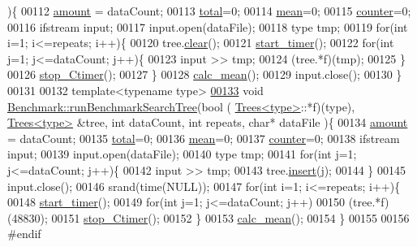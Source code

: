 \begin{DoxyCode}
      )\{
00112   \hyperlink{class_benchmark_a1d0eaa6febe9b7a7f5f5147e83f60910}{amount} = dataCount;
00113   \hyperlink{class_benchmark_a7130c0718e3a3ab2fea70285dab122a2}{total}=0; 
00114   \hyperlink{class_benchmark_aa88092b6164ad7d1243162d3012f729a}{mean}=0;
00115   \hyperlink{class_benchmark_a3a56c7dad0b21e490f3024d5d0027f31}{counter}=0;
00116   ifstream input;
00117   input.open(dataFile);
00118   type tmp;
00119   \textcolor{keywordflow}{for}(\textcolor{keywordtype}{int} i=1; i<=repeats; i++)\{
00120     tree.\hyperlink{class_trees_ac9020e649202c980ecb9917e13524471}{clear}();
00121     \hyperlink{class_timer_a83d4b873e3275a61004b5679672045c0}{start\_timer}();
00122     \textcolor{keywordflow}{for}(\textcolor{keywordtype}{int} j=1; j<=dataCount; j++)\{
00123       input >> tmp;
00124       (tree.*f)(tmp);
00125     \}
00126     \hyperlink{class_benchmark_ab65889d4c2df3eb503048ab1cc6e7413}{stop\_Ctimer}();
00127   \}
00128   \hyperlink{class_benchmark_ac4d5360d2850510913efe07cf957f4c1}{calc\_mean}();
00129   input.close();
00130 \}
00131 
00132 \textcolor{keyword}{template}<\textcolor{keyword}{typename} type>
\hypertarget{benchmark_8hh_source_l00133}{}\hyperlink{class_benchmark_a9e6b5ef8df351452be5fa0c8d127367a}{00133} \textcolor{keywordtype}{void} \hyperlink{class_benchmark_a9e6b5ef8df351452be5fa0c8d127367a}{Benchmark::runBenchmarkSearchTree}(\textcolor{keywordtype}{bool} (
      \hyperlink{class_trees}{Trees<type>}::*f)(type), \hyperlink{class_trees}{Trees<type>} &tree, \textcolor{keywordtype}{int} dataCount, \textcolor{keywordtype}{int} repeats, \textcolor{keywordtype}{char}* dataFile
      )\{
00134   \hyperlink{class_benchmark_a1d0eaa6febe9b7a7f5f5147e83f60910}{amount} = dataCount;
00135   \hyperlink{class_benchmark_a7130c0718e3a3ab2fea70285dab122a2}{total}=0; 
00136   \hyperlink{class_benchmark_aa88092b6164ad7d1243162d3012f729a}{mean}=0;
00137   \hyperlink{class_benchmark_a3a56c7dad0b21e490f3024d5d0027f31}{counter}=0;
00138   ifstream input;
00139   input.open(dataFile);
00140   type tmp;
00141   \textcolor{keywordflow}{for}(\textcolor{keywordtype}{int} j=1; j<=dataCount; j++)\{
00142     input >> tmp;
00143     tree.\hyperlink{class_trees_a00b4642b409350691f93b4b94598e68e}{insert}(j);
00144   \}
00145   input.close();
00146   srand(time(NULL));
00147   \textcolor{keywordflow}{for}(\textcolor{keywordtype}{int} i=1; i<=repeats; i++)\{
00148     \hyperlink{class_timer_a83d4b873e3275a61004b5679672045c0}{start\_timer}();
00149     \textcolor{keywordflow}{for}(\textcolor{keywordtype}{int} j=1; j<=dataCount; j++)
00150       (tree.*f)(48830);
00151     \hyperlink{class_benchmark_ab65889d4c2df3eb503048ab1cc6e7413}{stop\_Ctimer}();
00152   \}
00153   \hyperlink{class_benchmark_ac4d5360d2850510913efe07cf957f4c1}{calc\_mean}();
00154 \}
00155 
00156 \textcolor{preprocessor}{#endif}
\end{DoxyCode}
